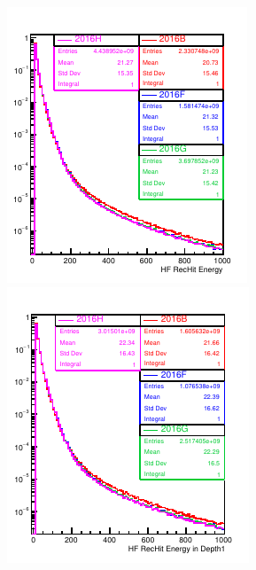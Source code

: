 \begin{figure}[!h] %
\begin{minipage}[c]{0.32\linewidth}
\centering
\includegraphics[width=0.99\linewidth]{../Figures/Chap2/ImageFiles_HF/BasicPics/Comp2016/RecHitsE2016BFGH.pdf}
\end{minipage}
\begin{minipage}[c]{0.32\linewidth}
\centering
\includegraphics[width=0.99\linewidth]{../Figures/Chap2/ImageFiles_HF/BasicPics/Comp2016/RecHitsEL2016BFGH.pdf}

\end{minipage}
\end{figure}

